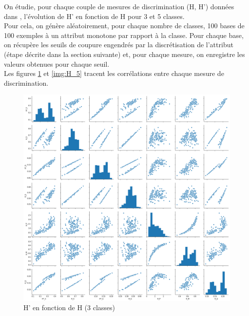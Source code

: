 \documentclass[a4paper]{article}
\begin{document}
On étudie, pour chaque couple de mesures de discrimination (H, H') données dans
\cite{marsala-rank}, l'évolution de H' en fonction de H pour 3 et 5 classes.
\\ Pour cela, on génère aléatoirement, pour chaque nombre de classes, 100 bases
de 100 exemples à un attribut monotone par rapport à la classe. Pour chaque
base, on récupère les seuils de coupure engendrés par la discrétisation de
l'attribut (étape décrite dans la section suivante) et, pour
chaque mesure, on enregistre les valeurs obtenues pour chaque seuil.\\ Les
figures \ref{img:H_3} et \ref{img:H_5} tracent les corrélations
entre chaque mesure de discrimination. \\

\begin{figure}[H]
	\center 
	\includegraphics[width=1\textwidth]{images/H_3.png}
    \caption{H' en fonction de H (3 classes)}
    \label{img:H_3}
\end{figure}
\end{document}
